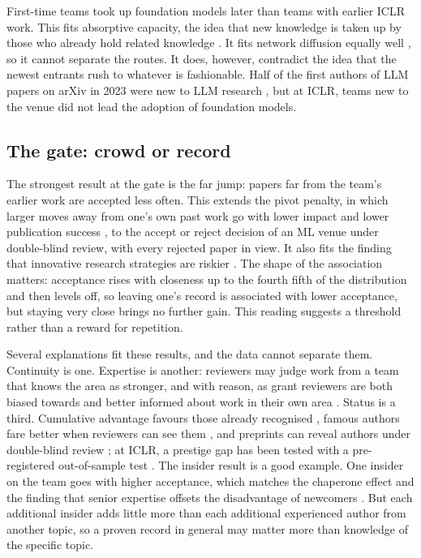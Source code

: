 First-time teams took up foundation models later than teams with earlier ICLR work. This fits absorptive capacity,
the idea that new knowledge is taken up by those who already hold related knowledge \citep{cohen1990absorptive}. It
fits network diffusion equally well \citep{coleman1957diffusion,rogers2003diffusion}, so it cannot separate the routes.
It does, however, contradict the idea that the newest entrants rush to whatever is fashionable. Half of the first
authors of LLM papers on arXiv in 2023 were new to LLM research \citep{movva2024topics}, but at ICLR, teams new to the
venue did not lead the adoption of foundation models.

\subsection{The gate: crowd or record}

The strongest result at the gate is the far jump: papers far from the team's earlier work are accepted less often.
This extends the pivot penalty, in which larger moves away from one's own past work go with lower impact and lower
publication success \citep{hill2025pivot}, to the accept or reject decision of an ML venue under double-blind review,
with every rejected paper in view. It also fits the finding that innovative research strategies are riskier
\citep{foster2015tradition}. The shape of the association matters: acceptance rises with closeness up to the fourth
fifth of the distribution and then levels off, so leaving one's record is associated with lower acceptance, but staying
very close brings no further gain. This reading suggests a threshold rather than a reward for repetition.

Several explanations fit these results, and the data cannot separate them. Continuity is one. Expertise is another:
reviewers may judge work from a team that knows the area as stronger, and with reason, as grant reviewers are both
biased towards and better informed about work in their own area \citep{li2017expertise}. Status is a third.
Cumulative advantage favours those already recognised \citep{merton1968matthew}, famous authors fare better when
reviewers can see them \citep{tomkins2017reviewer}, and preprints can reveal authors under double-blind review
\citep{bharadhwaj2020deanonymization}; at ICLR, a prestige gap has been tested with a pre-registered out-of-sample test
\citep{ibrahim2026bias}. The insider result is a good example. One insider on the team goes with higher acceptance,
which matches the chaperone effect \citep{sekara2018chaperone} and the finding that senior expertise offsets the
disadvantage of newcomers \citep{biliotti2024breaking}. But each additional insider adds little more than each
additional experienced author from another topic, so a proven record in general may matter more than knowledge of the
specific topic.

